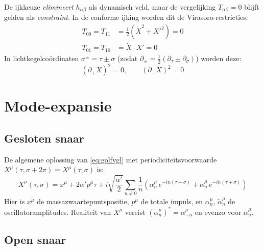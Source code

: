 \documentclass[12pt,a4paper]{article}
\begin{document}
            De ijkkeuze \emph{elimineert} $h_{\alpha\beta}$ als dynamisch veld, maar de vergelijking $T_{\alpha\beta} = 0$ blijft gelden als \emph{constraint}. In de conforme ijking worden dit de Virasoro-restricties:
            \begin{align}
                T_{00} = T_{11} &= \tfrac{1}{2}(\dot X^2 + X'^2) = 0 \label{eq:V1}\\
                T_{01} = T_{10} &= \dot X\cdot X' = 0 \label{eq:V2}
            \end{align}
            In lichtkegelco\"ordinaten $\sigma^\pm = \tau \pm \sigma$ (zodat $\partial_\pm = \tfrac{1}{2}(\partial_\tau \pm \partial_\sigma)$) worden deze:
            \begin{equation}
                (\partial_+ X)^2 = 0, \qquad (\partial_- X)^2 = 0
                \label{eq:Virasoro_licht}
            \end{equation}

    \section{Mode-expansie}

        \subsection{Gesloten snaar}

            De algemene oplossing van \eqref{eq:golfvgl} met periodiciteitsvoorwaarde $X^\mu(\tau,\sigma+2\pi) = X^\mu(\tau,\sigma)$ is:
            \begin{equation}
                X^\mu(\tau,\sigma) = x^\mu + 2\alpha' p^\mu\tau + i\sqrt{\frac{\alpha'}{2}}\sum_{n\neq 0}\frac{1}{n}\left(\alpha_n^\mu\,e^{-in(\tau-\sigma)} + \tilde\alpha_n^\mu\,e^{-in(\tau+\sigma)}\right)
                \label{eq:mode_gesloten}
            \end{equation}
            Hier is $x^\mu$ de massazwaartepuntspo\-sitie, $p^\mu$ de totale impuls, en $\alpha_n^\mu$, $\tilde\alpha_n^\mu$ de oscillatoramplitudes. Realiteit van $X^\mu$ vereist $(\alpha_n^\mu)^* = \alpha_{-n}^\mu$ en evenzo voor $\tilde\alpha_n^\mu$.

        \subsection{Open snaar}
\end{document}
